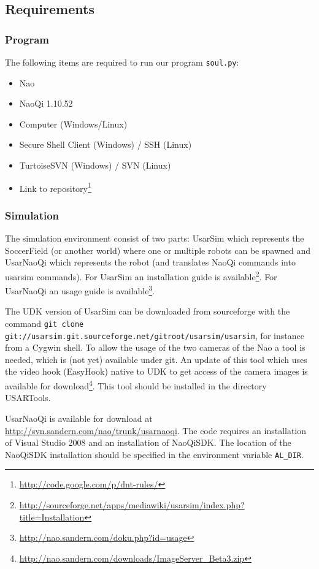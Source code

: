 \documentclass[11pt,a4paper,oneside]{article}
\begin{document}
\subsection{Requirements}
\subsubsection{Program}
The following items are required to run our program \texttt{soul.py}:
\begin{itemize}
\item Nao
\item NaoQi 1.10.52
\item Computer (Windows/Linux)
\item Secure Shell Client (Windows) / SSH (Linux)
\item TurtoiseSVN (Windows) / SVN (Linux)
\item Link to repository\footnote{\url{http://code.google.com/p/dnt-rules/}}
\end{itemize}

\subsubsection{Simulation}
The simulation environment consist of two parts: UsarSim which represents the SoccerField (or another world) where one or multiple robots can be spawned and UsarNaoQi which represents the robot (and translates NaoQi commands into usarsim commands).
For UsarSim an installation guide is available\footnote{\url{http://sourceforge.net/apps/mediawiki/usarsim/index.php?title=Installation}}. For UsarNaoQi an usage guide is available\footnote{\url{http://nao.sandern.com/doku.php?id=usage}}.

The UDK version of UsarSim can be downloaded from sourceforge with the command \texttt{git clone git://usarsim.git.sourceforge.net/gitroot/usarsim/usarsim}, for instance from a Cygwin shell. To allow the usage of the two cameras of the Nao a tool is needed, which is (not yet) available
under git. An update of this tool which uses the video hook (EasyHook) native to UDK to get access of the camera images is available for download\footnote{\url{http://nao.sandern.com/downloads/ImageServer_Beta3.zip}}. This tool should be installed in the directory USARTools.

UsarNaoQi is available for download at \url{http://svn.sandern.com/nao/trunk/usarnaoqi}. The code requires an installation of Visual Studio 2008 and an installation of NaoQiSDK. The location of the NaoQiSDK installation should be specified in the environment variable \texttt{AL\_DIR}.
\end{document}

